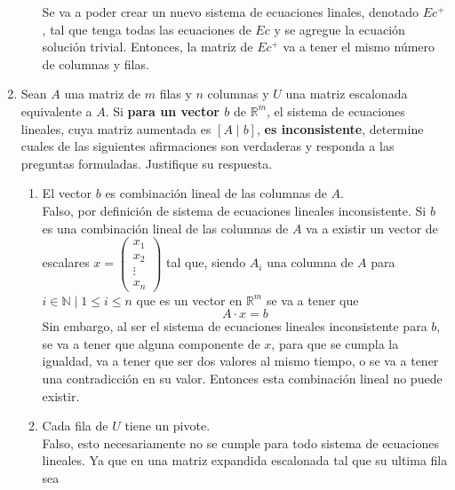\documentclass{article}
\begin{document}
\begin{enumerate}
\begin{enumerate}[label=\listAlph]
                Se va a poder crear un nuevo sistema de ecuaciones linales, denotado \(Ec^+\), tal que tenga todas las ecuaciones de \(Ec\) 
                y se agregue la ecuación solución trivial. Entonces, la matriz de \(Ec^+\) va a tener el mismo número de columnas y filas.
        \end{enumerate}
    \item Sean \(A\) una matriz de \(m\) filas y \(n\) columnas y \(U\) una matriz escalonada equivalente a \(A\). 
        Si \textbf{para un vector \(b\)} de \(\mathbb{R}^m\),
        el sistema de ecuaciones lineales, cuya matriz aumentada es \(\left[A \mid b\right]\),
        \textbf{es inconsistente}, 
        determine cuales de las siguientes afirmaciones son verdaderas y responda a las preguntas formuladas. 
        Justifique su respuesta.
        \begin{enumerate}[label=\listAlph]
            \item El vector \(b\) es combinación lineal de las columnas de \(A\). \\
                Falso, por definición de sistema de ecuaciones lineales inconsistente. Si \(b\) es una combinación lineal de las columnas de \(A\) va a existir un vector de escalares
                \(x = \begin{pmatrix}x_1 \\ x_2 \\ \vdots \\ x_n\end{pmatrix}\) tal que, siendo \(A_i\) una columna de \(A\) para \(i \in \mathbb{N} \mid 1 \leq i \leq n\) 
                    que es un vector en \(\mathbb{R}^m\) se va a tener que
                \[
                    A \cdot x = b
                \]
                Sin embargo, al ser el sistema de ecuaciones lineales inconsistente para \(b\), se va a tener que alguna componente de \(x\), para 
                que se cumpla la igualdad, va a tener que ser dos valores al mismo tiempo, o se va a tener una contradicción en su valor. 
                Entonces esta combinación lineal no puede existir.
            \setcounter{enumii}{2}
            \item Cada fila de \(U\) tiene un pivote. \\
                Falso, esto necesariamente no se cumple para todo sistema de ecuaciones lineales. Ya que en una matriz expandida escalonada tal que su ultima fila sea

\end{enumerate}
\end{enumerate}
\end{document}
